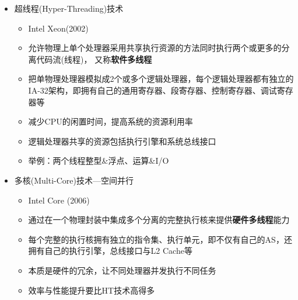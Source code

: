 \begin{itemize}
	\item 超线程(Hyper-Threading)技术
	\begin{itemize}
		\item Intel Xeon(2002)
		\item 允许物理上单个处理器采用共享执行资源的方法同时执行两个或更多的分离代码流(线程)， 又称\textbf{软件多线程}
		\item 把单物理处理器模拟成2个或多个逻辑处理器，每个逻辑处理器都有独立的IA-32架构，即拥有自己的通用寄存器、段寄存器、控制寄存器、调试寄存器等
		\item 减少CPU的闲置时间，提高系统的资源利用率
		\item 逻辑处理器共享的资源包括执行引擎和系统总线接口
		\item 举例：两个线程整型\&浮点、运算\&I/O
	\end{itemize}
	\item 多核(Multi-Core)技术---空间并行
	\begin{itemize}
		\item Intel Core (2006)
		\item 通过在一个物理封装中集成多个分离的完整执行核来提供\textbf{硬件多线程}能力
		\item 每个完整的执行核拥有独立的指令集、执行单元，即不仅有自己的AS，还拥有自己的执行引擎，总线接口与L2 Cache等
		\item 本质是硬件的冗余，让不同处理器并发执行不同任务
		\item 效率与性能提升要比HT技术高得多
	\end{itemize}
\end{itemize}

